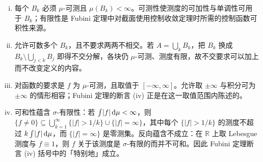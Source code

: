 \documentclass[../../main.tex]{subfiles}%
\begin{document}
\begin{remark}\label{remark:ch01-def-1-17-条件}
\begin{enumerate}[(i)]
\item 每个 $B_k$ 必须 $\mu$-可测且 $\mu(B_k)<\infty$。可测性使测度的可加性与单调性可用于 $B_k$；有限性是 Fubini 定理中对截面使用控制收敛定理时所需的控制函数可积性来源。
\item 允许可数多个 $B_k$，且不要求两两不相交。若 $A=\bigcup_k B_k$，把 $B_k$ 换成 $B_k\setminus\bigcup_{j<k}B_j$ 即得不交分解，各块仍 $\mu$-可测、测度有限，故不交要求可以加上而不改变定义的内容。
\item 对函数的要求是 $f$ 为 $\mu$-可测，且取值于 $[-\infty,\infty]$。允许取 $\pm\infty$ 与积分可为 $\pm\infty$ 的情形相容；Fubini 定理的断言 (iv) 正是在这一取值范围内陈述的。
\item 可和性蕴含 $\sigma$-有限性：若 $\int\lvert f\rvert\,\mathrm{d}\mu<\infty$，则
$\{f\neq0\}\subseteq\bigcup_{k=1}^{\infty}\{|f|>1/k\}\cup\{|f|=\infty\}$，其中每个 $\{|f|>1/k\}$ 的测度不超过 $k\int\lvert f\rvert\,\mathrm{d}\mu$，而 $\{|f|=\infty\}$ 是零测集。反向蕴含不成立：在 $\mathbb{R}$ 上取 Lebesgue 测度与 $f\equiv1$，则 $f$ 关于该测度是 $\sigma$-有限的而并不可和。因此 Fubini 定理断言 (iv) 括号中的「特别地」成立。
\end{enumerate}
\end{remark}
\end{document}
